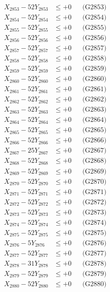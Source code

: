 \documentclass[a4paper,10pt]{article}
\begin{document}
{\begin{align}
X_{2853} - 52Y_{2853} &\leq +0 && \text{(G2853)} \\
X_{2854} - 52Y_{2854} &\leq +0 && \text{(G2854)} \\
X_{2855} - 52Y_{2855} &\leq +0 && \text{(G2855)} \\
X_{2856} - 52Y_{2856} &\leq +0 && \text{(G2856)} \\
X_{2857} - 52Y_{2857} &\leq +0 && \text{(G2857)} \\
X_{2858} - 52Y_{2858} &\leq +0 && \text{(G2858)} \\
X_{2859} - 52Y_{2859} &\leq +0 && \text{(G2859)} \\
X_{2860} - 52Y_{2860} &\leq +0 && \text{(G2860)} \\
\allowbreak
X_{2861} - 52Y_{2861} &\leq +0 && \text{(G2861)} \\
X_{2862} - 52Y_{2862} &\leq +0 && \text{(G2862)} \\
X_{2863} - 52Y_{2863} &\leq +0 && \text{(G2863)} \\
X_{2864} - 52Y_{2864} &\leq +0 && \text{(G2864)} \\
X_{2865} - 52Y_{2865} &\leq +0 && \text{(G2865)} \\
X_{2866} - 52Y_{2866} &\leq +0 && \text{(G2866)} \\
X_{2867} - 25Y_{2867} &\leq +0 && \text{(G2867)} \\
X_{2868} - 52Y_{2868} &\leq +0 && \text{(G2868)} \\
X_{2869} - 52Y_{2869} &\leq +0 && \text{(G2869)} \\
X_{2870} - 52Y_{2870} &\leq +0 && \text{(G2870)} \\
\allowbreak
X_{2871} - 52Y_{2871} &\leq +0 && \text{(G2871)} \\
X_{2872} - 52Y_{2872} &\leq +0 && \text{(G2872)} \\
X_{2873} - 52Y_{2873} &\leq +0 && \text{(G2873)} \\
X_{2874} - 52Y_{2874} &\leq +0 && \text{(G2874)} \\
X_{2875} - 52Y_{2875} &\leq +0 && \text{(G2875)} \\
X_{2876} - 5Y_{2876} &\leq +0 && \text{(G2876)} \\
X_{2877} - 52Y_{2877} &\leq +0 && \text{(G2877)} \\
X_{2878} - 31Y_{2878} &\leq +0 && \text{(G2878)} \\
X_{2879} - 52Y_{2879} &\leq +0 && \text{(G2879)} \\
X_{2880} - 52Y_{2880} &\leq +0 && \text{(G2880)} \\
\allowbreak

\end{align}}
\end{document}

